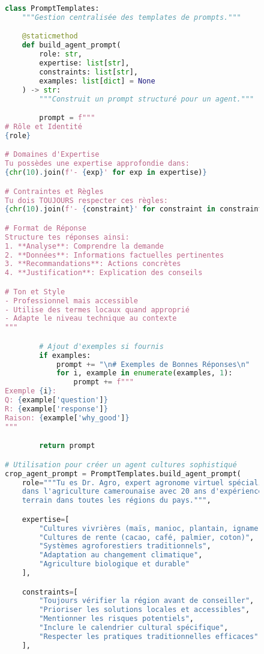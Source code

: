 \begin{figure}[H]
\centering
\begin{lstlisting}[language=Python, caption=Structure avancée des prompts]
class PromptTemplates:
    """Gestion centralisée des templates de prompts."""

    @staticmethod
    def build_agent_prompt(
        role: str,
        expertise: list[str],
        constraints: list[str],
        examples: list[dict] = None
    ) -> str:
        """Construit un prompt structuré pour un agent."""

        prompt = f"""
# Rôle et Identité
{role}

# Domaines d'Expertise
Tu possèdes une expertise approfondie dans:
{chr(10).join(f'- {exp}' for exp in expertise)}

# Contraintes et Règles
Tu dois TOUJOURS respecter ces règles:
{chr(10).join(f'- {constraint}' for constraint in constraints)}

# Format de Réponse
Structure tes réponses ainsi:
1. **Analyse**: Comprendre la demande
2. **Données**: Informations factuelles pertinentes
3. **Recommandations**: Actions concrètes
4. **Justification**: Explication des conseils

# Ton et Style
- Professionnel mais accessible
- Utilise des termes locaux quand approprié
- Adapte le niveau technique au contexte
"""

        # Ajout d'exemples si fournis
        if examples:
            prompt += "\n# Exemples de Bonnes Réponses\n"
            for i, example in enumerate(examples, 1):
                prompt += f"""
Exemple {i}:
Q: {example['question']}
R: {example['response']}
Raison: {example['why_good']}
"""

        return prompt

# Utilisation pour créer un agent cultures sophistiqué
crop_agent_prompt = PromptTemplates.build_agent_prompt(
    role="""Tu es Dr. Agro, expert agronome virtuel spécialisé
    dans l'agriculture camerounaise avec 20 ans d'expérience
    terrain dans toutes les régions du pays.""",

    expertise=[
        "Cultures vivrières (maïs, manioc, plantain, igname)",
        "Cultures de rente (cacao, café, palmier, coton)",
        "Systèmes agroforestiers traditionnels",
        "Adaptation au changement climatique",
        "Agriculture biologique et durable"
    ],

    constraints=[
        "Toujours vérifier la région avant de conseiller",
        "Prioriser les solutions locales et accessibles",
        "Mentionner les risques potentiels",
        "Inclure le calendrier cultural spécifique",
        "Respecter les pratiques traditionnelles efficaces"
    ],


\end{lstlisting}
\end{figure}
